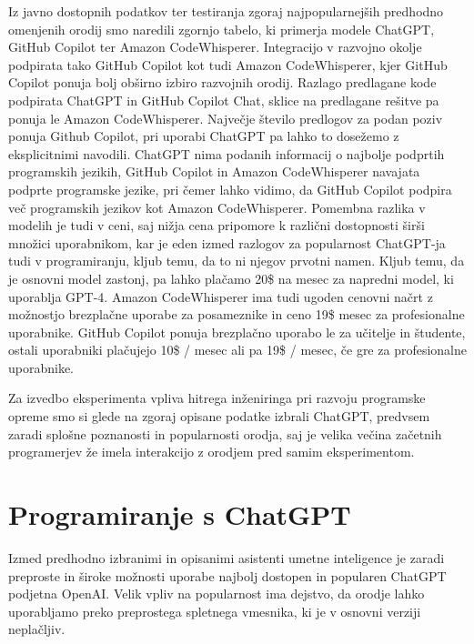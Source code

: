\documentclass[a4paper,12pt,openright]{book}
\begin{document}
Iz javno dostopnih podatkov ter testiranja zgoraj najpopularnejših predhodno omenjenih orodij smo naredili zgornjo tabelo, ki primerja modele ChatGPT, GitHub Copilot ter Amazon CodeWhisperer. Integracijo v razvojno okolje podpirata tako GitHub Copilot kot tudi Amazon CodeWhisperer, kjer GitHub Copilot ponuja bolj obširno izbiro razvojnih orodij. Razlago predlagane kode podpirata ChatGPT in GitHub Copilot Chat, sklice na predlagane rešitve pa ponuja le Amazon CodeWhisperer. Največje število predlogov za podan poziv ponuja Github Copilot, pri uporabi ChatGPT pa lahko to dosežemo z eksplicitnimi navodili. ChatGPT nima podanih informacij o najbolje podprtih programskih jezikih, GitHub Copilot in Amazon CodeWhisperer navajata podprte programske jezike, pri čemer lahko vidimo, da GitHub Copilot podpira več programskih jezikov kot Amazon CodeWhisperer. Pomembna razlika v modelih je tudi v ceni, saj nižja cena pripomore k različni dostopnosti širši množici uporabnikom, kar je eden izmed razlogov za popularnost ChatGPT-ja tudi v programiranju, kljub temu, da to ni njegov prvotni namen. Kljub temu, da je osnovni model zastonj, pa lahko plačamo 20\$ na mesec za napredni model, ki uporablja GPT-4. Amazon CodeWhisperer ima tudi ugoden cenovni načrt z možnostjo brezplačne uporabe za posameznike in ceno 19\$ mesec za profesionalne uporabnike. GitHub Copilot ponuja brezplačno uporabo le za učitelje in študente, ostali uporabniki plačujejo 10\$ / mesec ali pa 19\$ / mesec, če gre za profesionalne uporabnike.
\cite{github_copilot_chat}
\cite{openai_chatgpt}
\cite{saasworthy_codewhisperer}

Za izvedbo eksperimenta vpliva hitrega inženiringa pri razvoju programske opreme smo si glede na zgoraj opisane podatke izbrali ChatGPT, predvsem zaradi splošne poznanosti in popularnosti orodja, saj je velika večina začetnih programerjev že imela interakcijo z orodjem pred samim eksperimentom.

\section{Programiranje s ChatGPT}
Izmed predhodno izbranimi in opisanimi asistenti umetne inteligence je zaradi preproste in široke možnosti uporabe najbolj dostopen in popularen ChatGPT podjetna OpenAI. Velik vpliv na popularnost ima dejstvo, da orodje lahko uporabljamo preko preprostega spletnega vmesnika, ki je v osnovni verziji neplačljiv.
\end{document}
